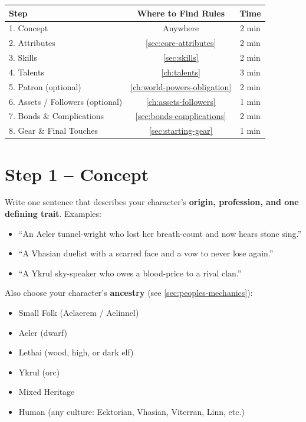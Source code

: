 \begin{center}
\footnotesize
\begin{tabular}{lcc}
\toprule
\textbf{Step} & \textbf{Where to Find Rules} & \textbf{Time} \\
\midrule
1. Concept & Anywhere & 2 min \\
2. Attributes & \ref{sec:core-attributes} & 2 min \\
3. Skills & \ref{sec:skills} & 2 min \\
4. Talents & \ref{ch:talents} & 3 min \\
5. Patron (optional) & \ref{ch:world-powers-obligation} & 2 min \\
6. Assets / Followers (optional) & \ref{ch:assets-followers} & 1 min \\
7. Bonds \& Complications & \ref{sec:bonds-complications} & 2 min \\
8. Gear \& Final Touches & \ref{sec:starting-gear} & 1 min \\
\bottomrule
\end{tabular}
\end{center}

\section{Step 1 -- Concept}
Write one sentence that describes your character's \textbf{origin, profession, and one defining trait}. Examples:
\begin{itemize}
  \item ``An Aeler tunnel-wright who lost her breath-count and now hears stone sing.''
  \item ``A Vhasian duelist with a scarred face and a vow to never lose again.''
  \item ``A Ykrul sky-speaker who owes a blood-price to a rival clan.''
\end{itemize}
Also choose your character's \textbf{ancestry} (see \ref{sec:peoples-mechanics}):
\begin{itemize}
  \item Small Folk (Aelaerem / Aelinnel)
  \item Aeler (dwarf)
  \item Lethai (wood, high, or dark elf)
  \item Ykrul (orc)
  \item Mixed Heritage
  \item Human (any culture: Ecktorian, Vhasian, Viterran, Linn, etc.)
\end{itemize}

